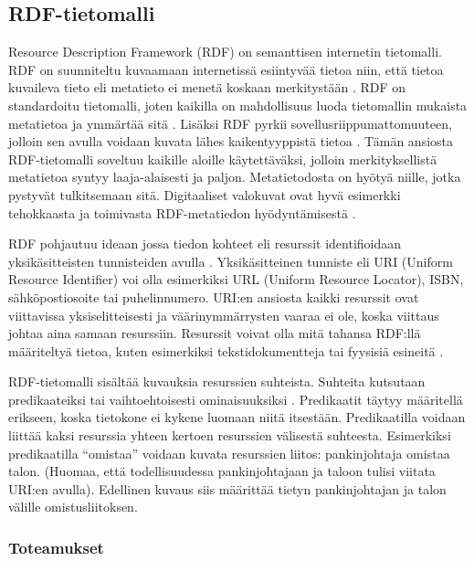 \documentclass[finnish, 12pt, a4paper, elec, utf8, pdfa, online]{aaltothesis}
\begin{document}
\subsection{RDF-tietomalli}
Resource Description Framework (RDF) on semanttisen internetin tietomalli. RDF on suunniteltu kuvaamaan internetissä esiintyvää tietoa niin, että tietoa kuvaileva tieto eli metatieto ei menetä koskaan merkitystään \cite{RDF_specification}. RDF on standardoitu tietomalli, joten kaikilla on mahdollisuus luoda tietomallin mukaista metatietoa ja ymmärtää sitä \cite{metadata}. Lisäksi RDF pyrkii sovellusriippumattomuuteen, jolloin sen avulla voidaan kuvata lähes kaikentyyppistä tietoa \cite{RDF_specification}. Tämän ansiosta RDF-tietomalli soveltuu kaikille aloille käytettäväksi, jolloin merkityksellistä metatietoa syntyy laaja-alaisesti ja paljon. Metatietodosta on hyötyä niille, jotka pystyvät tulkitsemaan sitä. Digitaaliset valokuvat ovat hyvä esimerkki tehokkaasta ja toimivasta RDF-metatiedon hyödyntämisestä \cite{XMP1} \cite{profium_metadata}.

RDF pohjautuu ideaan jossa tiedon kohteet eli resurssit identifioidaan yksikäsitteisten tunnisteiden avulla \cite{RDF_specification}. Yksikäsitteinen tunniste eli URI (Uniform Resource Identifier) voi olla esimerkiksi URL (Uniform Resource Locator), ISBN, sähköpostiosoite tai puhelinnumero. URI:en ansiosta kaikki resurssit ovat viittavissa yksiselitteisesti ja väärinymmärrysten vaaraa ei ole, koska viittaus johtaa aina samaan resurssiin. Resurssit voivat olla mitä tahansa RDF:llä määriteltyä tietoa, kuten esimerkiksi tekstidokumentteja tai fyysisiä esineitä \cite{RDF_specification}.

RDF-tietomalli sisältää kuvauksia resurssien suhteista. Suhteita kutsutaan predikaateiksi tai vaihtoehtoisesti ominaisuuksiksi \cite{Antoniou}. Predikaatit täytyy määritellä erikseen, koska tietokone ei kykene luomaan niitä itsestään. Predikaatilla voidaan liittää kaksi resurssia yhteen kertoen resurssien välisestä suhteesta. Esimerkiksi predikaatilla ``omistaa'' voidaan kuvata resurssien liitos: pankinjohtaja omistaa talon. (Huomaa, että todellisuudessa pankinjohtajaan ja taloon tulisi viitata URI:en avulla). Edellinen kuvaus siis määrittää tietyn pankinjohtajan ja talon välille omistusliitoksen.

\subsubsection{Toteamukset}
\end{document}
